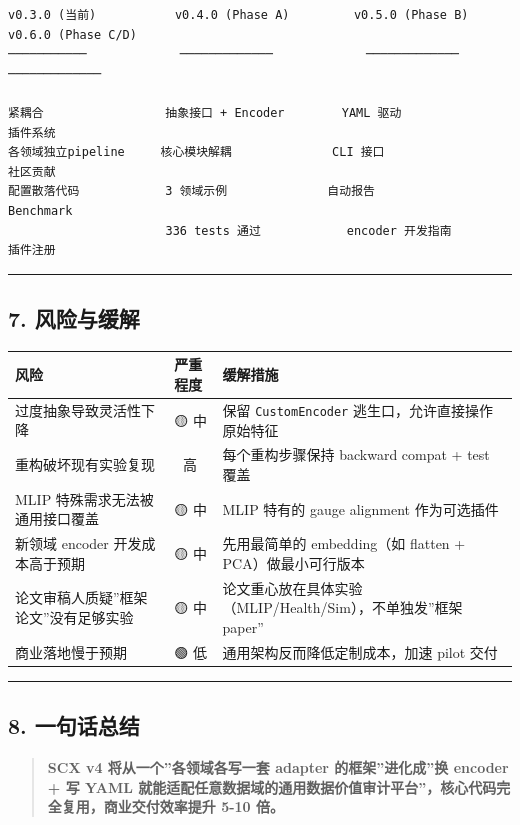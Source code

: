 \documentclass[
  12pt,
]{ctexart}
\begin{document}
\begin{verbatim}
v0.3.0 (当前)           v0.4.0 (Phase A)         v0.5.0 (Phase B)         v0.6.0 (Phase C/D)
───────────             ─────────────             ─────────────             ─────────────

紧耦合                 抽象接口 + Encoder        YAML 驱动                插件系统
各领域独立pipeline     核心模块解耦              CLI 接口                  社区贡献
配置散落代码            3 领域示例              自动报告                   Benchmark
                      336 tests 通过            encoder 开发指南          插件注册
\end{verbatim}

\begin{center}\rule{0.5\linewidth}{0.5pt}\end{center}

\subsection{7. 风险与缓解}\label{ux98ceux9669ux4e0eux7f13ux89e3}

\begin{longtable}[]{@{}
  >{\raggedright\arraybackslash}p{}
  >{\raggedright\arraybackslash}p{}
  >{\raggedright\arraybackslash}p{}@{}}
\toprule\noalign{}
\begin{minipage}[b]{\linewidth}\raggedright
风险
\end{minipage} & \begin{minipage}[b]{\linewidth}\raggedright
严重程度
\end{minipage} & \begin{minipage}[b]{\linewidth}\raggedright
缓解措施
\end{minipage} \\
\midrule\noalign{}
\endhead
\bottomrule\noalign{}
\endlastfoot
过度抽象导致灵活性下降 & 🟡 中 & 保留 \texttt{CustomEncoder}
逃生口，允许直接操作原始特征 \\
重构破坏现有实验复现 & 🔴 高 & 每个重构步骤保持 backward compat + test
覆盖 \\
MLIP 特殊需求无法被通用接口覆盖 & 🟡 中 & MLIP 特有的 gauge alignment
作为可选插件 \\
新领域 encoder 开发成本高于预期 & 🟡 中 & 先用最简单的 embedding（如
flatten + PCA）做最小可行版本 \\
论文审稿人质疑''框架论文''没有足够实验 & 🟡 中 &
论文重心放在具体实验（MLIP/Health/Sim），不单独发''框架 paper'' \\
商业落地慢于预期 & 🟢 低 & 通用架构反而降低定制成本，加速 pilot 交付 \\
\end{longtable}

\begin{center}\rule{0.5\linewidth}{0.5pt}\end{center}

\subsection{8. 一句话总结}\label{ux4e00ux53e5ux8bddux603bux7ed3}

\begin{quote}
\textbf{SCX v4 将从一个''各领域各写一套 adapter 的框架''进化成''换
encoder + 写 YAML
就能适配任意数据域的通用数据价值审计平台''，核心代码完全复用，商业交付效率提升
5-10 倍。}
\end{quote}
\end{document}
